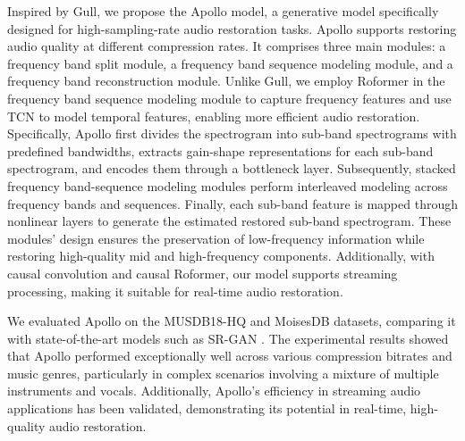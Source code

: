 Inspired by Gull, we propose the Apollo model, a generative model specifically designed for high-sampling-rate audio restoration tasks. Apollo supports restoring audio quality at different compression rates. It comprises three main modules: a frequency band split module, a frequency band sequence modeling module, and a frequency band reconstruction module. Unlike Gull, we employ Roformer \cite{su2024roformer} in the frequency band sequence modeling module to capture frequency features and use TCN to model temporal features, enabling more efficient audio restoration. Specifically, Apollo first divides the spectrogram into sub-band spectrograms with predefined bandwidths, extracts gain-shape representations for each sub-band spectrogram, and encodes them through a bottleneck layer. Subsequently, stacked frequency band-sequence modeling modules perform interleaved modeling across frequency bands and sequences. Finally, each sub-band feature is mapped through nonlinear layers to generate the estimated restored sub-band spectrogram. These modules' design ensures the preservation of low-frequency information while restoring high-quality mid and high-frequency components. Additionally, with causal convolution and causal Roformer, our model supports streaming processing, making it suitable for real-time audio restoration.

We evaluated Apollo on the MUSDB18-HQ \cite{rafii2019musdb18} and MoisesDB \cite{pereira2023moisesdb} datasets, comparing it with state-of-the-art models such as SR-GAN \cite{lattner2021stochastic}. The experimental results showed that Apollo performed exceptionally well across various compression bitrates and music genres, particularly in complex scenarios involving a mixture of multiple instruments and vocals. Additionally, Apollo's efficiency in streaming audio applications has been validated, demonstrating its potential in real-time, high-quality audio restoration.